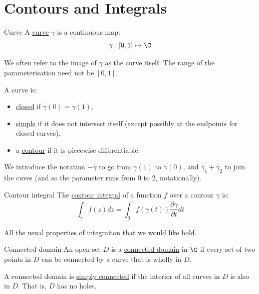 \documentclass[../Main.tex]{subfiles}
\begin{document}
\section{Contours and Integrals}
\begin{definition}{Curve}
    A \underline{curve} $\gamma$ is a continuous map:
    \begin{equation*}
        \gamma : [0, 1] \mapsto \C
    \end{equation*}
\end{definition}
We often refer to the image of $\gamma$ as the curve itself. The range of the parameterisation need not be $[0, 1]$.

A curve is:
\begin{itemize}
    \item \underline{closed} if $\gamma(0)=\gamma(1)$,
    \item \underline{simple} if it does not intersect itself (except possibly at the endpoints for closed curves),
    \item a \underline{contour} if it is piecewise-differentiable.
\end{itemize}
We introduce the notation $-\gamma$ to go from $\gamma(1)$ to $\gamma(0)$, and $\gamma_1 + \gamma_2$ to join the cuves (and so the parameter runs from $0$ to $2$, notationally).

\begin{definition}{Contour integral}
    The \underline{contour integral} of a function $f$ over a contour $\gamma$ is:
    \begin{equation*}
        \int_\gamma f(z) dz = \int_{0}^{1} f(\gamma(t)) \frac{\partial \gamma}{\partial t} dt
    \end{equation*}
\end{definition}
All the usual properties of integration that we would like hold.

\begin{definition}{Connected domain}
    An open set $D$ is a \underline{connected domain} in $\C$ if every set of two points in $D$ can be connected by a curve that is wholly in $D$.
\end{definition}
A connected domain is \underline{simply connected} if the interior of all curves in $D$ is also in $D$. That is, $D$ has no holes.
\end{document}
